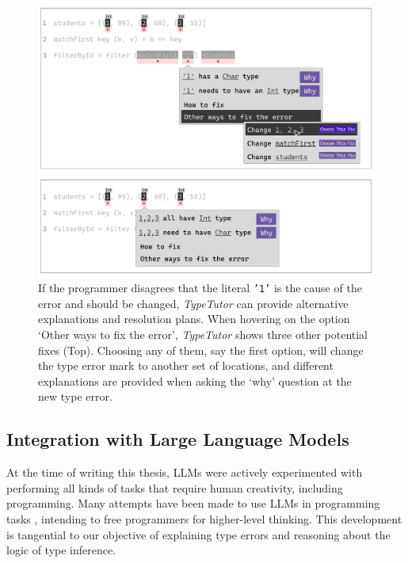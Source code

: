 \begin{figure}[hbt]
  \includegraphics[width=\linewidth]{WhatIf}
  \caption{
      \label{fig:what-if}
      If the programmer disagrees that the literal \texttt{'1'} is the cause of the error and should be changed, \textit{TypeTutor} can provide alternative explanations and resolution plans. When hovering on the option `Other ways to fix the error', \textit{TypeTutor} shows three other potential fixes (Top). Choosing any of them, say the first option, will change the type error mark to another set of locations, and different explanations are provided when asking the `why' question at the new type error.
    }
\end{figure}


\subsection{Integration with Large Language Models}
At the time of writing this thesis, LLMs were actively experimented with performing all kinds of tasks that require human creativity, including programming. Many attempts have been made to use LLMs in programming tasks , intending to free programmers for higher-level thinking. This development is tangential to our objective of explaining type errors and reasoning about the logic of type inference. 

